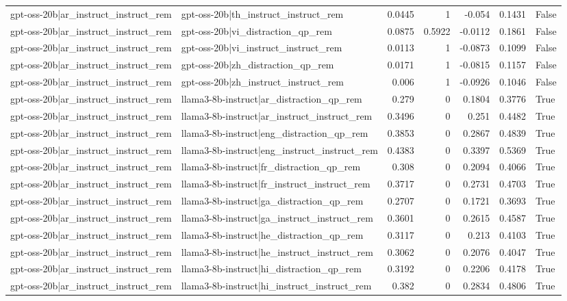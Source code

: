 \begin{table}
\begin{tabular}{l l r r r r l}
gpt-oss-20b|ar_instruct_instruct_rem & gpt-oss-20b|th_instruct_instruct_rem & 0.0445 & 1 & -0.054 & 0.1431 & False \\
gpt-oss-20b|ar_instruct_instruct_rem & gpt-oss-20b|vi_distraction_qp_rem & 0.0875 & 0.5922 & -0.0112 & 0.1861 & False \\
gpt-oss-20b|ar_instruct_instruct_rem & gpt-oss-20b|vi_instruct_instruct_rem & 0.0113 & 1 & -0.0873 & 0.1099 & False \\
gpt-oss-20b|ar_instruct_instruct_rem & gpt-oss-20b|zh_distraction_qp_rem & 0.0171 & 1 & -0.0815 & 0.1157 & False \\
gpt-oss-20b|ar_instruct_instruct_rem & gpt-oss-20b|zh_instruct_instruct_rem & 0.006 & 1 & -0.0926 & 0.1046 & False \\
gpt-oss-20b|ar_instruct_instruct_rem & llama3-8b-instruct|ar_distraction_qp_rem & 0.279 & 0 & 0.1804 & 0.3776 & True \\
gpt-oss-20b|ar_instruct_instruct_rem & llama3-8b-instruct|ar_instruct_instruct_rem & 0.3496 & 0 & 0.251 & 0.4482 & True \\
gpt-oss-20b|ar_instruct_instruct_rem & llama3-8b-instruct|eng_distraction_qp_rem & 0.3853 & 0 & 0.2867 & 0.4839 & True \\
gpt-oss-20b|ar_instruct_instruct_rem & llama3-8b-instruct|eng_instruct_instruct_rem & 0.4383 & 0 & 0.3397 & 0.5369 & True \\
gpt-oss-20b|ar_instruct_instruct_rem & llama3-8b-instruct|fr_distraction_qp_rem & 0.308 & 0 & 0.2094 & 0.4066 & True \\
gpt-oss-20b|ar_instruct_instruct_rem & llama3-8b-instruct|fr_instruct_instruct_rem & 0.3717 & 0 & 0.2731 & 0.4703 & True \\
gpt-oss-20b|ar_instruct_instruct_rem & llama3-8b-instruct|ga_distraction_qp_rem & 0.2707 & 0 & 0.1721 & 0.3693 & True \\
gpt-oss-20b|ar_instruct_instruct_rem & llama3-8b-instruct|ga_instruct_instruct_rem & 0.3601 & 0 & 0.2615 & 0.4587 & True \\
gpt-oss-20b|ar_instruct_instruct_rem & llama3-8b-instruct|he_distraction_qp_rem & 0.3117 & 0 & 0.213 & 0.4103 & True \\
gpt-oss-20b|ar_instruct_instruct_rem & llama3-8b-instruct|he_instruct_instruct_rem & 0.3062 & 0 & 0.2076 & 0.4047 & True \\
gpt-oss-20b|ar_instruct_instruct_rem & llama3-8b-instruct|hi_distraction_qp_rem & 0.3192 & 0 & 0.2206 & 0.4178 & True \\
gpt-oss-20b|ar_instruct_instruct_rem & llama3-8b-instruct|hi_instruct_instruct_rem & 0.382 & 0 & 0.2834 & 0.4806 & True \\

\end{tabular}
\end{table}
